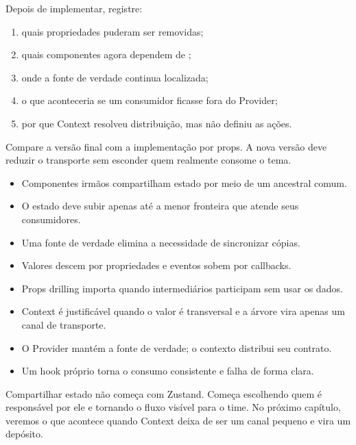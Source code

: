 Depois de implementar, registre:

\begin{enumerate}
  \item quais propriedades puderam ser removidas;
  \item quais componentes agora dependem de ;
  \item onde a fonte de verdade continua localizada;
  \item o que aconteceria se um consumidor ficasse fora do Provider;
  \item por que Context resolveu distribuição, mas não definiu as ações.
\end{enumerate}


Compare a versão final com a implementação por props. A nova versão deve reduzir
o transporte sem esconder quem realmente consome o tema.

\begin{resumo}
\begin{itemize}
  \item Componentes irmãos compartilham estado por meio de um ancestral comum.
  \item O estado deve subir apenas até a menor fronteira que atende seus
    consumidores.
  \item Uma fonte de verdade elimina a necessidade de sincronizar cópias.
  \item Valores descem por propriedades e eventos sobem por callbacks.
  \item Props drilling importa quando intermediários participam sem usar os
    dados.
  \item Context é justificável quando o valor é transversal e a árvore vira
    apenas um canal de transporte.
  \item O Provider mantém a fonte de verdade; o contexto distribui seu contrato.
  \item Um hook próprio torna o consumo consistente e falha de forma clara.
\end{itemize}
\end{resumo}

Compartilhar estado não começa com Zustand. Começa escolhendo quem é responsável
por ele e tornando o fluxo visível para o time. No próximo capítulo, veremos o
que acontece quando Context deixa de ser um canal pequeno e vira um depósito.
